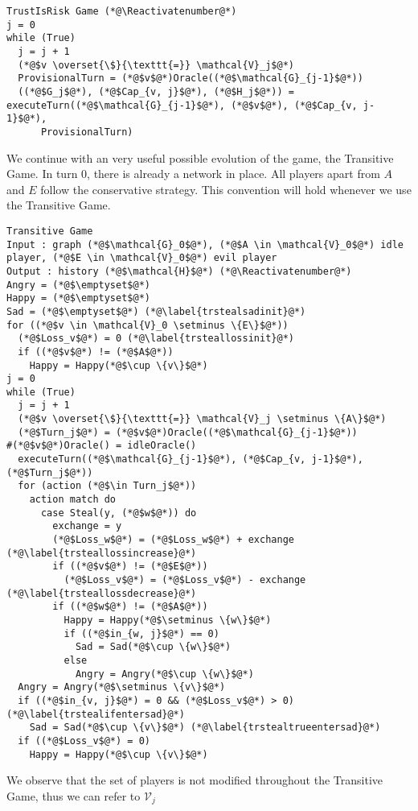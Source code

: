 \documentclass[11pt]{llncs}
\makeatletter
\newcommand*\Suppressnumber{%
  \lst@AddToHook{OnNewLine}{%
    \let\thelstnumber\relax%
     \advance\c@lstnumber-\@ne\relax%
    }%
}
\makeatother
\begin{document}
    \Suppressnumber
    \begin{lstlisting}[label=trustisriskgame, style=numbers]
TrustIsRisk Game (*@\Reactivatenumber@*)
j = 0
while (True)
  j = j + 1
  (*@$v \overset{\$}{\texttt{=}} \mathcal{V}_j$@*)
  ProvisionalTurn = (*@$v$@*)Oracle((*@$\mathcal{G}_{j-1}$@*))
  ((*@$G_j$@*), (*@$Cap_{v, j}$@*), (*@$H_j$@*)) = executeTurn((*@$\mathcal{G}_{j-1}$@*), (*@$v$@*), (*@$Cap_{v, j-1}$@*),
      ProvisionalTurn)
    \end{lstlisting}
    We continue with an very useful possible evolution of the game, the Transitive Game. In turn 0, there is already a
    network in place. All players apart from $A$ and $E$ follow the conservative strategy. This convention will hold
    whenever we use the Transitive Game.
    \Suppressnumber
    \begin{lstlisting}[label=transitivegame, style=numbers]
Transitive Game
Input : graph (*@$\mathcal{G}_0$@*), (*@$A \in \mathcal{V}_0$@*) idle player, (*@$E \in \mathcal{V}_0$@*) evil player
Output : history (*@$\mathcal{H}$@*) (*@\Reactivatenumber@*)
Angry = (*@$\emptyset$@*)
Happy = (*@$\emptyset$@*)
Sad = (*@$\emptyset$@*) (*@\label{trstealsadinit}@*)
for ((*@$v \in \mathcal{V}_0 \setminus \{E\}$@*))
  (*@$Loss_v$@*) = 0 (*@\label{trsteallossinit}@*)
  if ((*@$v$@*) != (*@$A$@*))
    Happy = Happy(*@$\cup \{v\}$@*)
j = 0
while (True)
  j = j + 1
  (*@$v \overset{\$}{\texttt{=}} \mathcal{V}_j \setminus \{A\}$@*)
  (*@$Turn_j$@*) = (*@$v$@*)Oracle((*@$\mathcal{G}_{j-1}$@*))               #(*@$v$@*)Oracle() = idleOracle()
  executeTurn((*@$\mathcal{G}_{j-1}$@*), (*@$Cap_{v, j-1}$@*), (*@$Turn_j$@*))
  for (action (*@$\in Turn_j$@*))
    action match do
      case Steal(y, (*@$w$@*)) do
        exchange = y
        (*@$Loss_w$@*) = (*@$Loss_w$@*) + exchange (*@\label{trsteallossincrease}@*)
        if ((*@$v$@*) != (*@$E$@*))
          (*@$Loss_v$@*) = (*@$Loss_v$@*) - exchange (*@\label{trsteallossdecrease}@*)
        if ((*@$w$@*) != (*@$A$@*))
          Happy = Happy(*@$\setminus \{w\}$@*)
          if ((*@$in_{w, j}$@*) == 0)
            Sad = Sad(*@$\cup \{w\}$@*)
          else
            Angry = Angry(*@$\cup \{w\}$@*)
  Angry = Angry(*@$\setminus \{v\}$@*)
  if ((*@$in_{v, j}$@*) = 0 && (*@$Loss_v$@*) > 0) (*@\label{trstealifentersad}@*)
    Sad = Sad(*@$\cup \{v\}$@*) (*@\label{trstealtrueentersad}@*)
  if ((*@$Loss_v$@*) = 0)
    Happy = Happy(*@$\cup \{v\}$@*)
    \end{lstlisting}
    We observe that the set of players is not modified throughout the Transitive Game, thus we can refer to $\mathcal{V}_j$
\end{document}
